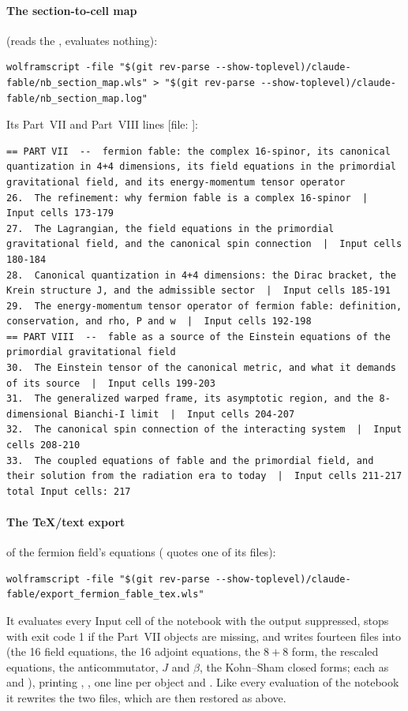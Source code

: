 \paragraph{The section-to-cell map} (reads the , evaluates nothing):
\begin{Verbatim}[fontsize=\scriptsize]
wolframscript -file "$(git rev-parse --show-toplevel)/claude-fable/nb_section_map.wls" > "$(git rev-parse --show-toplevel)/claude-fable/nb_section_map.log"
\end{Verbatim}
Its Part~VII and Part~VIII lines [file: ]:
\begin{Verbatim}[fontsize=\scriptsize]
== PART VII  --  fermion fable: the complex 16-spinor, its canonical quantization in 4+4 dimensions, its field equations in the primordial gravitational field, and its energy-momentum tensor operator
26.  The refinement: why fermion fable is a complex 16-spinor  |  Input cells 173-179
27.  The Lagrangian, the field equations in the primordial gravitational field, and the canonical spin connection  |  Input cells 180-184
28.  Canonical quantization in 4+4 dimensions: the Dirac bracket, the Krein structure J, and the admissible sector  |  Input cells 185-191
29.  The energy-momentum tensor operator of fermion fable: definition, conservation, and rho, P and w  |  Input cells 192-198
== PART VIII  --  fable as a source of the Einstein equations of the primordial gravitational field
30.  The Einstein tensor of the canonical metric, and what it demands of its source  |  Input cells 199-203
31.  The generalized warped frame, its asymptotic region, and the 8-dimensional Bianchi-I limit  |  Input cells 204-207
32.  The canonical spin connection of the interacting system  |  Input cells 208-210
33.  The coupled equations of fable and the primordial field, and their solution from the radiation era to today  |  Input cells 211-217
total Input cells: 217
\end{Verbatim}

\paragraph{The TeX/text export} of the fermion field's equations ( quotes one of its files):
\begin{Verbatim}[fontsize=\scriptsize]
wolframscript -file "$(git rev-parse --show-toplevel)/claude-fable/export_fermion_fable_tex.wls"
\end{Verbatim}
It evaluates every Input cell of the notebook with the output suppressed, stops with exit code 1 if the
Part~VII objects are missing, and writes fourteen files into  (the 16 field
equations, the 16 adjoint equations, the $8+8$ form, the rescaled equations, the anticommutator, $J$ and
$\beta$, the Kohn--Sham closed forms; each as  and ), printing
,
, one  line per object
and . Like every evaluation of the notebook it rewrites the two  files,
which are then restored as above.

